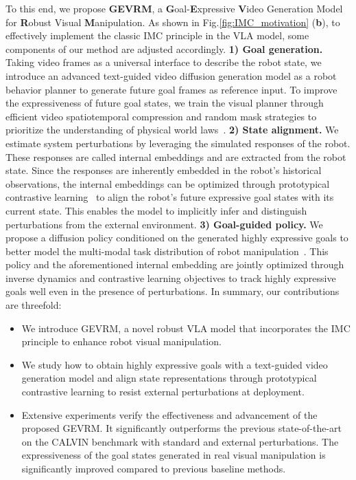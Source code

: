 To this end, we propose \textbf{GEVRM}, a \textbf{G}oal-\textbf{E}xpressive \textbf{V}ideo Generation Model for \textbf{R}obust Visual \textbf{M}anipulation.
As shown in Fig.\ref{fig:IMC_motivation} (\textbf{b}), to effectively implement the classic IMC principle in the VLA model, some components of our method are adjusted accordingly. 
\textbf{1) Goal generation.} Taking video frames as a universal interface to describe the robot state, we introduce an advanced text-guided video diffusion generation model as a robot behavior planner to generate future goal frames as reference input. 
To improve the expressiveness of future goal states, we train the visual planner through efficient video spatiotemporal compression and random mask strategies to prioritize the understanding of physical world laws~\citep{phyworld}.
\textbf{2) State alignment.} We estimate system perturbations by leveraging the simulated responses of the robot. 
These responses are called internal embeddings and are extracted from the robot state. 
Since the responses are inherently embedded in the robot's historical observations, the internal embeddings can be optimized through prototypical contrastive learning~\citep{caron2020unsupervised,yarats2021reinforcement,deng2022dreamerpro} to align the robot's future expressive goal states with its current state. 
This enables the model to implicitly infer and distinguish perturbations from the external environment.
\textbf{3) Goal-guided policy.} We propose a diffusion policy conditioned on the generated highly expressive goals to better model the multi-modal task distribution of robot manipulation~\citep{chi2023diffusion}. 
This policy and the aforementioned internal embedding are jointly optimized through inverse dynamics and contrastive learning objectives to track highly expressive goals well even in the presence of perturbations. 
In summary, our contributions are threefold:
\begin{itemize}
\item We introduce GEVRM, a novel robust VLA model that incorporates the IMC principle to enhance robot visual manipulation.
\item We study how to obtain highly expressive goals with a text-guided video generation model and align state representations through prototypical contrastive learning to resist external perturbations at deployment.
\item Extensive experiments verify the effectiveness and advancement of the proposed GEVRM. 
It significantly outperforms the previous state-of-the-art on the CALVIN benchmark with standard and external perturbations. 
The expressiveness of the goal states generated in real visual manipulation is significantly improved compared to previous baseline methods.
\end{itemize}

